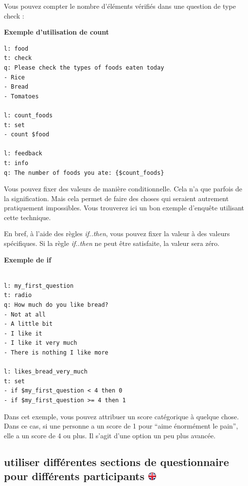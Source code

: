 \documentclass[
]{book}
\begin{document}
Vous pouvez compter le nombre d'éléments vérifiés dans une question de type check :

\textbf{Exemple d'utilisation de count}

\begin{verbatim}
l: food
t: check
q: Please check the types of foods eaten today
- Rice
- Bread
- Tomatoes

l: count_foods
t: set
- count $food

l: feedback
t: info
q: The number of foods you ate: {$count_foods}
\end{verbatim}

Vous pouvez fixer des valeurs de manière conditionnelle. Cela n'a que parfois de la signification. Mais cela permet de faire des choses qui seraient autrement pratiquement impossibles. Vous trouverez ici un bon exemple d'enquête utilisant cette technique.

En bref, à l'aide des règles \emph{if..then}, vous pouvez fixer la valeur à des valeurs spécifiques. Si la règle \emph{if..then} ne peut être satisfaite, la valeur sera zéro.

\textbf{Exemple de if}

\begin{verbatim}

l: my_first_question
t: radio
q: How much do you like bread?
- Not at all
- A little bit
- I like it
- I like it very much
- There is nothing I like more

l: likes_bread_very_much
t: set
- if $my_first_question < 4 then 0
- if $my_first_question >= 4 then 1
\end{verbatim}

Dans cet exemple, vous pouvez attribuer un score catégorique à quelque chose. Dans ce cas, si une personne a un score de 1 pour ``aime énormément le pain'', elle a un score de 4 ou plus. Il s'agit d'une option un peu plus avancée.

\hypertarget{utiliser-diffuxe9rentes-sections-de-questionnaire-pour-diffuxe9rents-participants}{%
\subsection[utiliser différentes sections de questionnaire pour différents participants ]{\texorpdfstring{utiliser différentes sections de questionnaire pour différents participants \href{https://www.psytoolkit.org/doc3.4.0/online-survey-syntax.html\#randomjump}{\protect\includegraphics{img/ukflag.png}}}{utiliser différentes sections de questionnaire pour différents participants }}\label{utiliser-diffuxe9rentes-sections-de-questionnaire-pour-diffuxe9rents-participants}}
\end{document}
